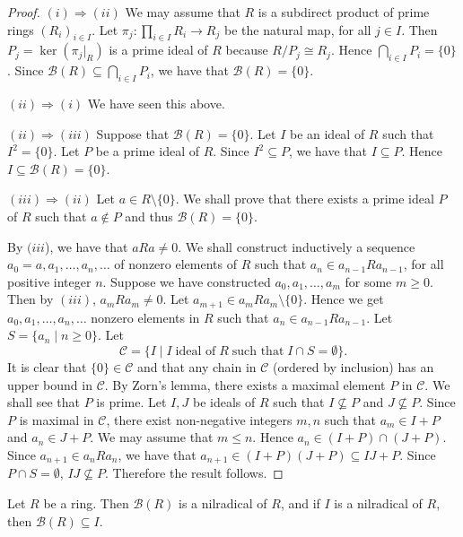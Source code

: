 \begin{proof}
$(i)\Rightarrow (ii)$ We may assume that $R$ is a subdirect product of prime rings $(R_i)_{i\in I}$. Let $\pi_j\colon\prod_{i\in I}R_i\rightarrow R_j$ be the natural map, for all $j\in I$. Then $P_j=\ker(\pi_j|_R)$ is a prime ideal of $R$ because $R/P_j\cong R_j$.
Hence $\bigcap_{i\in I}P_i=\{0\}$. Since $\mathcal{B}(R)\subseteq \bigcap_{i\in I}P_i$, we have that $\mathcal{B}(R)=\{0\}$.

$(ii)\Rightarrow (i)$ We have seen this above.


$(ii)\Rightarrow (iii)$ Suppose that $\mathcal{B}(R)=\{0\}$. Let $I$ be an ideal of $R$ such that $I^2=\{0\}$.
Let $P$ be a prime ideal of $R$. Since  $I^2\subseteq P$, we have that
$I\subseteq P$. Hence $I\subseteq \mathcal{B}(R)=\{0\}$.

$(iii)\Rightarrow (ii)$ Let $a\in R\setminus\{ 0\}$. We shall prove that there exists a prime ideal $P$ of $R$
such that $a\notin P$ and thus $\mathcal{B}(R)=\{0\}$.

By $(iii$), we have that $aRa\neq 0$. We shall construct inductively a sequence $a_0=a,a_1,\dots ,a_n,\dots$ of nonzero elements of $R$ such that
$a_n\in a_{n-1}Ra_{n-1}$, for all positive integer $n$. Suppose we have constructed
 $a_0,a_1,\dots,a_m$ for some $m\geq 0$. Then by $(iii)$,
$a_mRa_m\neq 0$. Let $a_{m+1}\in a_mRa_m\setminus\{ 0\}$. Hence we get $a_0,a_1,\dots,a_n,\dots$ nonzero elements in $R$
such that $a_n\in a_{n-1}Ra_{n-1}$. Let $S=\{ a_n\mid n\geq
0\}$. Let
$$\mathcal{C}=\{ I\mid I\;\mbox{ideal of}\; R\;\mbox{such that}\; I\cap
S=\emptyset \} .$$
It is clear that $\{0\}\in \mathcal{C}$ and that any chain in $\mathcal{C}$ (ordered by inclusion) has an upper bound in $\mathcal{C}$.
By Zorn's lemma, there exists a maximal element $P$ in $\mathcal{C}$. We shall see that $P$ is prime. Let $I,J$ be ideals
of $R$ such that $I\not\subseteq P$ and $J\not\subseteq P$. Since $P$
is maximal in $\mathcal{C}$, there exist non-negative integers $m,n$ such that
$a_m\in I+P$ and $a_n\in J+P$. We may assume that $m\leq n$. Hence
$a_n\in (I+P)\cap (J+P)$. Since $a_{n+1}\in a_nRa_n$, we have that
$a_{n+1}\in (I+P)(J+P)\subseteq IJ+P$. Since $P\cap S=\emptyset$,
$IJ\not\subseteq P$. Therefore the result follows.  
\end{proof}

\begin{proposition}\label{Prop1.3.7}
Let $R$ be a ring. Then $\mathcal{B}(R)$ is a nilradical of $R$, and
if $I$ is a nilradical of $R$, then $\mathcal{B}(R)\subseteq I$.
\end{proposition}

